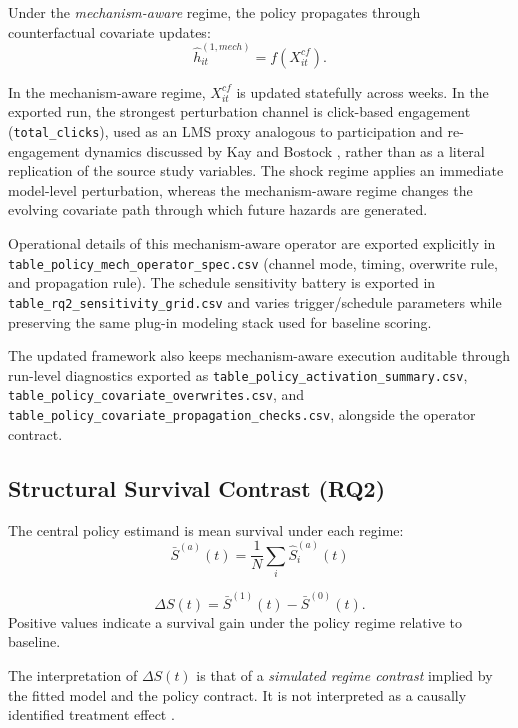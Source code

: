 Under the \textit{mechanism-aware} regime, the policy propagates through counterfactual covariate updates:
\begin{equation*}
\hat h^{(1,mech)}_{it}=f(X^{cf}_{it}).
\end{equation*}

In the mechanism-aware regime, $X^{cf}_{it}$ is updated statefully across weeks. In the exported run, the strongest perturbation channel is click-based engagement (\texttt{total\_clicks}), used as an LMS proxy analogous to participation and re-engagement dynamics discussed by Kay and Bostock \cite{KayBostock2023PowerNudge}, rather than as a literal replication of the source study variables. The shock regime applies an immediate model-level perturbation, whereas the mechanism-aware regime changes the evolving covariate path through which future hazards are generated.

Operational details of this mechanism-aware operator are exported explicitly in \nolinkurl{table_policy_mech_operator_spec.csv} (channel mode, timing, overwrite rule, and propagation rule). The schedule sensitivity battery is exported in \nolinkurl{table_rq2_sensitivity_grid.csv} and varies trigger/schedule parameters while preserving the same plug-in modeling stack used for baseline scoring.

The updated framework also keeps mechanism-aware execution auditable through run-level diagnostics exported as \nolinkurl{table_policy_activation_summary.csv}, \nolinkurl{table_policy_covariate_overwrites.csv}, and \nolinkurl{table_policy_covariate_propagation_checks.csv}, alongside the operator contract.

\subsection{Structural Survival Contrast (RQ2)}

The central policy estimand is mean survival under each regime:
\begin{equation*}
\bar S^{(a)}(t)=\frac{1}{N}\sum_i \hat S_i^{(a)}(t)
\end{equation*}

\begin{equation}
\label{eq:delta_s}
\Delta S(t)=\bar S^{(1)}(t)-\bar S^{(0)}(t).
\end{equation}
Positive values indicate a survival gain under the policy regime relative to baseline.

The interpretation of $\Delta S(t)$ is that of a \textit{simulated regime contrast} implied by the fitted model and the policy contract. It is not interpreted as a causally identified treatment effect \cite{Igelstrom2022CausalInferenceObs,DoutreligneVaroquaux2025PredictiveDecisionCausal}.

